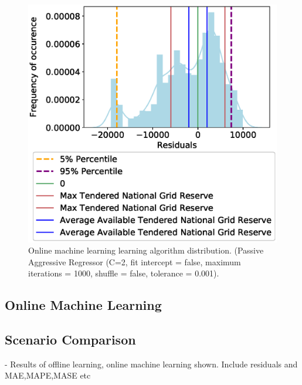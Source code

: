 \documentclass[final,3p,times,twocolumn,numbers]{elsarticle}
\begin{document}
\begin{figure}
\centering
\includegraphics[width=\columnwidth]{figures/results/online_learning_dists-PA-regressor-C-2-fit_intercept-false-max_iter-1000-shuffle-false-tol-0.001.eps}
\caption{Online machine learning learning algorithm distribution. (Passive Aggressive Regressor (C=2, fit intercept = false, maximum iterations = 1000, shuffle = false, tolerance = 0.001).}
\label{fig:bad_online_learning_day_distribution}
\end{figure}






\subsection{Online Machine Learning}


\subsection{Scenario Comparison}




- Results of offline learning, online machine learning shown. Include residuals and MAE,MAPE,MASE etc\\
\end{document}
